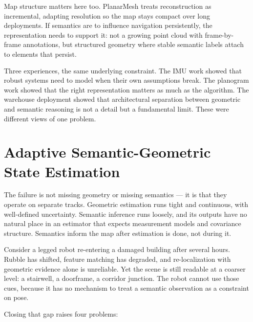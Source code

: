 \documentclass[11pt,a4paper]{article}
\begin{document}
Map structure matters here too. PlanarMesh \cite{wang2025planarmesh} 
treats reconstruction as incremental, adapting resolution so the map 
stays compact over long deployments. If semantics are to influence 
navigation persistently, the representation needs to support it: not 
a growing point cloud with frame-by-frame annotations, but structured 
geometry where stable semantic labels attach to elements that persist.

Three experiences, the same underlying constraint. The IMU work showed 
that robust systems need to model when their own assumptions break. 
The planogram work showed that the right representation matters as 
much as the algorithm. The warehouse deployment showed that 
architectural separation between geometric and semantic reasoning is 
not a detail but a fundamental limit. These were different views of 
one problem.
\section*{Adaptive Semantic-Geometric State Estimation}

The failure is not missing geometry or missing semantics — it is that 
they operate on separate tracks. Geometric estimation runs tight and 
continuous, with well-defined uncertainty. Semantic inference runs 
loosely, and its outputs have no natural place in an estimator that 
expects measurement models and covariance structure. Semantics inform 
the map after estimation is done, not during it.

Consider a legged robot re-entering a damaged building after several 
hours. Rubble has shifted, feature matching has degraded, and 
re-localization with geometric evidence alone is unreliable. Yet the 
scene is still readable at a coarser level: a stairwell, a doorframe, 
a corridor junction. The robot cannot use those cues, because it has 
no mechanism to treat a semantic observation as a constraint on pose.

Closing that gap raises four problems:
\end{document}
